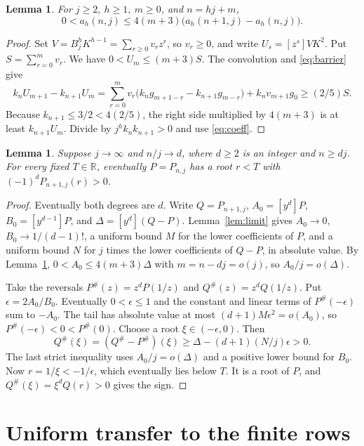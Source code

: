 \documentclass[11pt]{article}
\newtheorem{lemma}[theorem]{Lemma}
\begin{document}
\begin{lemma}\label{lem:growth}
For \(j\ge2,\ h\ge1,\ m\ge0\), and \(n=hj+m\),
\[
 0<a_h(n,j)\le4(m+3)\bigl(a_h(n+1,j)-a_h(n,j)\bigr).
\]
\end{lemma}
\begin{proof}
Set \(V=B_j^h K^{h-1}=\sum_{r\ge0}v_rz^r\), so \(v_r\ge0\), and write \(U_s=[z^s]VK^2\). Put \(S=\sum_{r=0}^m v_r\). We have \(0<U_m\le(m+3)S\). The convolution and \eqref{eq:barrier} give
\[
 k_n U_{m+1}-k_{n+1}U_m
  = \sum_{r=0}^m v_r\bigl(k_ng_{m+1-r}-k_{n+1}g_{m-r}\bigr)+k_n v_{m+1}g_0
  \ge(2/5)S .
\]
Because \(k_{n+1}\le3/2<4(2/5)\), the right side multiplied by \(4(m+3)\) is at least \(k_{n+1}U_m\). Divide by \(j^h k_n k_{n+1}>0\) and use \eqref{eq:coeff}.
\end{proof}

\begin{lemma}\label{lem:escape}
Suppose \(j\to\infty\) and \(n/j\to d\), where \(d\ge2\) is an integer and \(n\ge dj\). For every fixed \(T\in\mathbb R\), eventually \(P=P_{n,j}\) has a root \(r<T\) with \((-1)^dP_{n+1,j}(r)>0\).
\end{lemma}
\begin{proof}
Eventually both degrees are \(d\). Write \(Q=P_{n+1,j}\), \(A_0=[y^d]P\), \(B_0=[y^{d-1}]P\), and \(\Delta=[y^d](Q-P)\). Lemma~\ref{lem:limit} gives \(A_0\to0\), \(B_0\to1/(d-1)!\), a uniform bound \(M\) for the lower coefficients of \(P\), and a uniform bound \(N\) for \(j\) times the lower coefficients of \(Q-P\), in absolute value. By Lemma~\ref{lem:growth}, \(0<A_0\le4(m+3)\Delta\) with \(m=n-dj=o(j)\), so \(A_0/j=o(\Delta)\).

Take the reversals \(P^\#(z)=z^dP(1/z)\) and \(Q^\#(z)=z^dQ(1/z)\). Put \(\epsilon=2A_0/B_0\). Eventually \(0<\epsilon\le1\) and the constant and linear terms of \(P^\#(-\epsilon)\) sum to \(-A_0\). The tail has absolute value at most \((d+1)M\epsilon^2=o(A_0)\), so \(P^\#(-\epsilon)<0<P^\#(0)\). Choose a root \(\xi\in(-\epsilon,0)\). Then
\[
 Q^\#(\xi)=(Q^\#-P^\#)(\xi)\ge \Delta-(d+1)(N/j)\epsilon>0 .
\]
The last strict inequality uses \(A_0/j=o(\Delta)\) and a positive lower bound for \(B_0\). Now \(r=1/\xi<-1/\epsilon\), which eventually lies below \(T\). It is a root of \(P\), and \(Q^\#(\xi)=\xi^d Q(r)>0\) gives the sign.
\end{proof}

\section{Uniform transfer to the finite rows}
\end{document}
